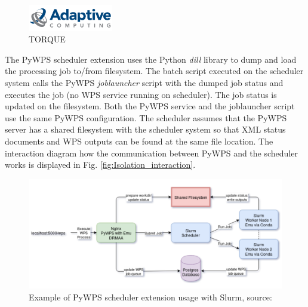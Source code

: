 \documentclass[12pt,a4paper]{article}
\begin{document}
\begin{figure}[h!]
\centering
\includegraphics[width=0.33\textwidth]{img/Isolation_torque.png}
\caption{TORQUE}
\label{fig:Isolation_torque}
\end{figure}
\bigskip

The PyWPS scheduler extension uses the Python \textit{dill} library to dump and load the processing job to/from filesystem. The batch script executed on the scheduler system calls the PyWPS \textit{joblauncher} script with the dumped job status and executes the job (no WPS service running on scheduler). The job status is updated on the filesystem. Both the PyWPS service and the joblauncher script use the same PyWPS configuration. The scheduler assumes that the PyWPS server has a shared filesystem with the scheduler system so that XML status documents and WPS outputs can be found at the same file location. The interaction diagram how the communication between PyWPS and the scheduler works is displayed in Fig. \ref{fig:Isolation_interaction}.

\bigskip
\begin{figure}[h!]
\centering
\includegraphics[width=\textwidth]{img/Isolation_slurm_usage.png}
\caption{Example of PyWPS scheduler extension usage with Slurm, source: \cite{PyWPS_docs}}
\label{fig:Isolation_slurm_usage}
\end{figure}
\end{document}
